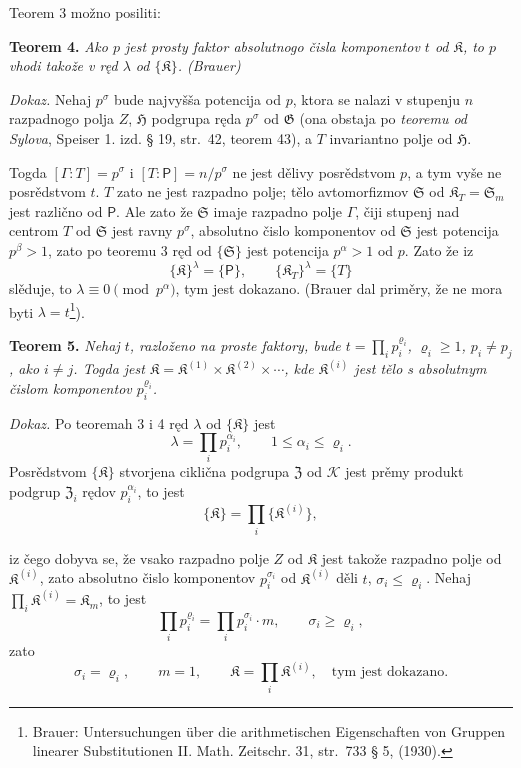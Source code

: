 \documentclass[11pt]{article}
\newcommand{\srcfn}[2]{\footnote{#2}}
\newcommand{\foreign}[1]{#1}
\begin{document}
Teorem 3 možno posiliti:

\textbf{Teorem 4.} \emph{Ako \(p\) jest prosty faktor absolutnogo čisla komponentov \(t\) od \(\mathfrak K\), to \(p\) vhodi takože v ręd \(\lambda\) od \(\{\mathfrak K\}\). (Brauer)}

\emph{Dokaz.} Nehaj \(p^\sigma\) bude najvyšša potencija od \(p\), ktora se nalazi v stupenju \(n\) razpadnogo polja \(Z\), \(\mathfrak H\) podgrupa ręda \(p^\sigma\) od \(\mathfrak G\) (ona obstaja po \emph{teoremu od Sylova}, Speiser 1. izd. § 19, str.~42, teorem 43), a \(T\) invariantno polje od \(\mathfrak H\).

Togda \([\Gamma:T]=p^\sigma\) i \([T:\mathsf P]=n/p^\sigma\) ne jest dělivy posrědstvom \(p\), a tym vyše ne posrědstvom \(t\). \(T\) zato ne jest razpadno polje; tělo avtomorfizmov \(\mathfrak S\) od \(\mathfrak K_T=\mathfrak S_m\) jest različno od \(\mathsf P\). Ale zato že \(\mathfrak S\) imaje razpadno polje \(\Gamma\), čiji stupenj nad centrom \(T\) od \(\mathfrak S\) jest ravny \(p^\sigma\), absolutno čislo komponentov od \(\mathfrak S\) jest potencija \(p^\beta>1\), zato po teoremu 3 ręd od \(\{\mathfrak S\}\) jest potencija \(p^\alpha>1\) od \(p\). Zato že iz
\[
\{\mathfrak K\}^{\lambda}=\{\mathsf P\},
\qquad
\{\mathfrak K_T\}^{\lambda}=\{T\}
\]
slěduje, to \(\lambda\equiv0\pmod {p^\alpha}\), tym jest dokazano. (Brauer dal priměry, že ne mora byti \(\lambda=t\)\srcfn{1}{\foreign{Brauer: Untersuchungen über die arithmetischen Eigenschaften von Gruppen linearer Substitutionen II. Math. Zeitschr. 31, str.~733 § 5, (1930).}}).

\textbf{Teorem 5.} \emph{Nehaj \(t\), razloženo na proste faktory, bude \(t=\prod_i p_i^{\varrho_i}\), \(\varrho_i\ge1\), \(p_i\ne p_j\), ako \(i\ne j\). Togda jest \(\mathfrak K=\mathfrak K^{(1)}\times\mathfrak K^{(2)}\times\cdots\), kde \(\mathfrak K^{(i)}\) jest tělo s absolutnym čislom komponentov \(p_i^{\varrho_i}\).}

\emph{Dokaz.} Po teoremah 3 i 4 ręd \(\lambda\) od \(\{\mathfrak K\}\) jest
\[
\lambda=\prod_i p_i^{\alpha_i},\qquad 1\le\alpha_i\le\varrho_i.
\]
Posrědstvom \(\{\mathfrak K\}\) stvorjena ciklična podgrupa \(\mathfrak Z\) od \(\mathscr K\) jest prěmy produkt podgrup \(\mathfrak Z_i\) rędov \(p_i^{\alpha_i}\), to jest
\[
\{\mathfrak K\}=\prod_i\{\mathfrak K^{(i)}\},
\]

iz čego dobyva se, že vsako razpadno polje \(Z\) od \(\mathfrak K\) jest takože razpadno polje od \(\mathfrak K^{(i)}\), zato absolutno čislo komponentov \(p_i^{\sigma_i}\) od \(\mathfrak K^{(i)}\) děli \(t\), \(\sigma_i\le\varrho_i\). Nehaj \(\prod_i \mathfrak K^{(i)}=\mathfrak K_m\), to jest
\[
\prod_i p_i^{\varrho_i}=\prod_i p_i^{\sigma_i}\cdot m,
\qquad
\sigma_i\ge\varrho_i,
\]
zato
\[
\sigma_i=\varrho_i,\qquad m=1,\qquad
\mathfrak K=\prod_i \mathfrak K^{(i)},
\quad\text{tym jest dokazano.}
\]
\end{document}
